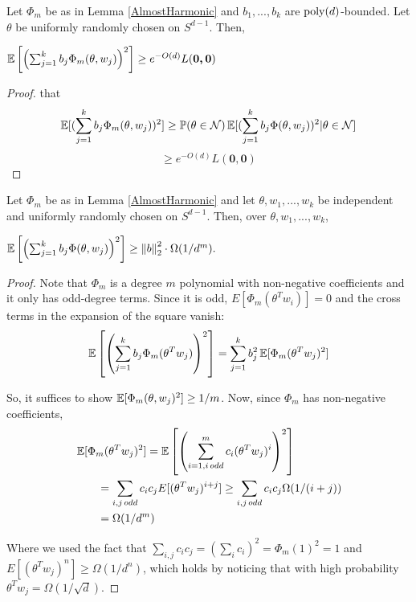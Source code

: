  
\begin{lemma}\label{bigVariance}
Let $\Phi_m$ be as in Lemma \ref{AlmostHarmonic} and $b_1,...,b_k$ are $\mathrm{poly}(d)$-bounded. Let $\theta$ be uniformly randomly chosen on $S^{d-1}$. Then,
 
 $\operatorname*{\mathbb{E}}\left[\left(  \sum_{j=1}^k b_j \Phi_m(\theta,w_j)\right)^2\right]
 \geq e^{-O(d)}L(\boldsymbol{0,0})$
\end{lemma}
\begin{proof}
 that 
\[\operatorname*{\mathbb{E}}[(  \sum_{j=1}^k b_j \Phi_m(\theta,w_j))^2]
 \geq \operatorname*{\mathbb{P}}(\theta \in \mathcal{N})\operatorname*{\mathbb{E}}[(\sum_{j=1}^k b_j \Phi(\theta, w_j))^2 | \theta \in \mathcal{N}]\]
\[\geq e^{-O(d)} L(\boldsymbol{0,0})\]
\end{proof}




\begin{lemma}\label{largeVariance}
  Let $\Phi_m$ be as in Lemma \ref{AlmostHarmonic}  and let $\theta, w_1,...,w_k$ be
  independent and uniformly randomly chosen on $S^{d-1}$. Then, over
  $\theta, w_1,...,w_k$,
 
 $\operatorname*{\mathbb{E}}\left[\left(  \sum_{j=1}^k b_j \Phi(\theta,w_j)\right)^2\right]
 \geq \left\lVert b \right\rVert_2^2 \cdot \Omega(1/d^m).$
\end{lemma}
%
\begin{proof}
Note that $\Phi_m$ is a degree $m$ polynomial with non-negative coefficients and it only has odd-degree terms. Since it is odd, $E[\Phi_m(\theta^Tw_i)] = 0$ and the cross terms in the expansion of the square vanish:
%
\[ \operatorname*{\mathbb{E}}\left[\left(  \sum_{j=1}^k b_j
     \Phi_m(\theta^Tw_j)\right)^2\right] = \sum_{j=1}^k b_j^2 \operatorname*{\mathbb{E}}[\Phi_m(\theta^Tw_j)^2]\]

So, it suffices to show $\operatorname*{\mathbb{E}}[\Phi_m(\theta,w_j)^2] \geq 1/m$.  Now, since $\Phi_m$ has non-negative coefficients,
\begin{align*}
& \operatorname*{\mathbb{E}}[\Phi_m(\theta^Tw_j)^2] = \operatorname*{\mathbb{E}}\left[\left(\sum_{i=1, i \,
                               odd}^m c_i
                               (\theta^Tw_j)^i\right)^2\right] \\
& \qquad = \sum_{i,j \,odd} c_ic_j E[(\theta^Tw_j)^{i+j}] \geq \sum_{i,j
  \,odd}c_i c_j \Omega(1/(i+j))  \\
& \qquad =\Omega(1/d^m) 
\end{align*}

Where we used the fact that
$\sum_{i,j} c_ic_j = (\sum_i c_i)^2 = \Phi_m(1)^2 = 1$ and
$E[(\theta^Tw_j)^{n}] \geq \Omega(1/d^{n})$, which holds by noticing that with high probability $\theta^T w_j = \Omega(1/\sqrt{d})$. 
\end{proof}

